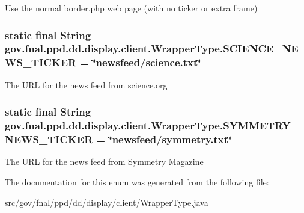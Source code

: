Use the normal border.\-php web page (with no ticker or extra frame) \hypertarget{enumgov_1_1fnal_1_1ppd_1_1dd_1_1display_1_1client_1_1WrapperType_a49f9c66d29be47efc42ef65755518d1b}{
\subsubsection[{S\-C\-I\-E\-N\-C\-E\-\_\-\-N\-E\-W\-S\-\_\-\-T\-I\-C\-K\-E\-R}]{\setlength{\rightskip}{0pt plus 5cm} static  final String gov.\-fnal.\-ppd.\-dd.\-display.\-client.\-Wrapper\-Type.\-S\-C\-I\-E\-N\-C\-E\-\_\-\-N\-E\-W\-S\-\_\-\-T\-I\-C\-K\-E\-R = \char`\"{}newsfeed/science.\-txt\char`\"{}\hspace{0.3cm}{\ttfamily [static]}}}\label{enumgov_1_1fnal_1_1ppd_1_1dd_1_1display_1_1client_1_1WrapperType_a49f9c66d29be47efc42ef65755518d1b}
The U\-R\-L for the news feed from science.\-org \hypertarget{enumgov_1_1fnal_1_1ppd_1_1dd_1_1display_1_1client_1_1WrapperType_ae9463619bd0d0484acef13fda6ef15f3}{
\subsubsection[{S\-Y\-M\-M\-E\-T\-R\-Y\-\_\-\-N\-E\-W\-S\-\_\-\-T\-I\-C\-K\-E\-R}]{\setlength{\rightskip}{0pt plus 5cm} static  final String gov.\-fnal.\-ppd.\-dd.\-display.\-client.\-Wrapper\-Type.\-S\-Y\-M\-M\-E\-T\-R\-Y\-\_\-\-N\-E\-W\-S\-\_\-\-T\-I\-C\-K\-E\-R = \char`\"{}newsfeed/symmetry.\-txt\char`\"{}\hspace{0.3cm}{\ttfamily [static]}}}\label{enumgov_1_1fnal_1_1ppd_1_1dd_1_1display_1_1client_1_1WrapperType_ae9463619bd0d0484acef13fda6ef15f3}
The U\-R\-L for the news feed from Symmetry Magazine 

The documentation for this enum was generated from the following file\-:\begin{DoxyCompactItemize}
\item 
src/gov/fnal/ppd/dd/display/client/Wrapper\-Type.\-java\end{DoxyCompactItemize}
